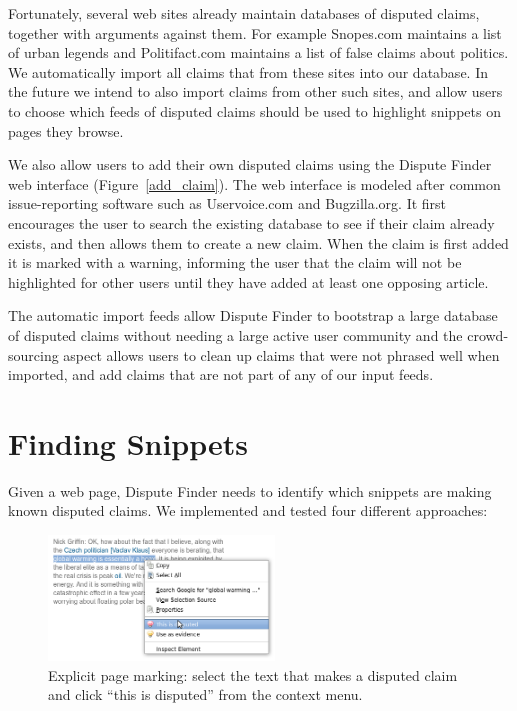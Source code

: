 \documentclass{www2010-submission}
\newcommand{\todo}[1]{}
\begin{document}
Fortunately, several web sites already maintain databases of disputed claims, together with arguments against them. For example Snopes.com maintains a list of urban legends and Politifact.com maintains a list of false claims about politics. We automatically import all claims that from these sites into our database. In the future we intend to also import claims from other such sites, and allow users to choose which feeds of disputed claims should be used to highlight snippets on pages they browse.

We also allow users to add their own disputed claims using the Dispute Finder web interface (Figure~\ref{add_claim}). The web interface is modeled after common issue-reporting software such as Uservoice.com and Bugzilla.org. It first encourages the user to search the existing database to see if their claim already exists, and then allows them to create a new claim. When the claim is first added it is marked with a warning, informing the user that the claim will not be highlighted for other users until they have added at least one opposing article.

The automatic import feeds allow Dispute Finder to bootstrap a large database of disputed claims without needing a large active user community and the crowd-sourcing aspect allows users to clean up claims that were not phrased well when imported, and add claims that are not part of any of our input feeds.

\todo{Say how many disputed claims}

\todo{talk about duplicates}

\todo{Actually import the Politifact data}


\section{Finding Snippets}

Given a web page, Dispute Finder needs to identify which snippets are making known disputed claims. We implemented and tested four different approaches:

\begin{figure}[tb]
	\begin{center}
	\includegraphics[width=6cm]{pictures/mark_disputed.png}
	\caption{Explicit page marking: select the text that makes a disputed claim and click ``this is disputed'' from the context menu.}
	\label{mark_disputed}
	\end{center}
\end{figure}
\end{document}
